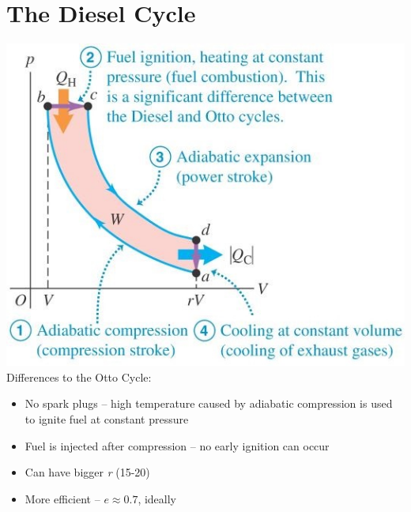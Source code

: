 \documentclass[a4paper, 11pt, normalem]{report}
\begin{document}
 \section{The Diesel Cycle}
\includegraphics[scale=0.8]{Diesel.jpg}\\
Differences to the Otto Cycle:
\begin{itemize}
	\item No spark plugs -- high temperature caused by adiabatic compression is used to ignite fuel at constant pressure
	\item Fuel is injected after compression -- no early ignition can occur
	\item Can have bigger \emph{r} (15-20)
	\item More efficient -- $e \approx 0.7$, ideally
\end{itemize}
\end{document}
